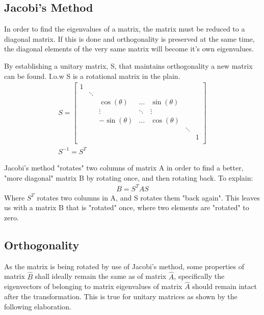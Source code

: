 \documentclass[11pt,a4paper,notitlepage]{article}
\begin{document}
\subsection{Jacobi's Method}\label{sec:jac}
In order to find the eigenvalues of a matrix, the matrix must be reduced to a diagonal matrix. If this is done and orthogonality is preserved at the same time, the diagonal elements of the very same matrix will become it's own eigenvalues. 

By establishing a unitary matrix, S, that maintains orthogonality a new matrix can be found.
I.o.w S is a rotational matrix in the plain.
\begin{align*}
	S = \begin{bmatrix}
		 1 & & & & &  \\
		 & \ddots & & & & \\
		 & & \cos(\theta)& \hdots & \sin(\theta)& & \\
		 & & \vdots & \ddots & \vdots & & \\
		 & & -\sin(\theta)& \hdots & \cos(\theta) & & \\
		 & & & & & \ddots & \\
		 & & & & & & 1 \\
	\end{bmatrix} \\
	S^{-1} = S^T
\end{align*}

Jacobi's method "rotates" two columns of matrix A in order to find a better, "more diagonal" matrix B by rotating once, and then rotating back. To explain:
\begin{align*}
	B = S^T A S
\end{align*}
Where $S^T$ rotates two columns in A, and S rotates them "back again". This leaves us with a matrix B that is "rotated" once, where two elements are "rotated" to zero. 
\subsection{Orthogonality} \label{sec:orthogonality}
As the matrix is being rotated by use of Jacobi's method, some properties of matrix $\hat{B}$ shall ideally remain the same as of matrix $\hat{A}$, specifically the eigenvectors of belonging to matrix eigenvalues of matrix $\hat{A}$ should remain intact after the transformation. This is true for unitary matrices as shown by the following elaboration.
\end{document}
